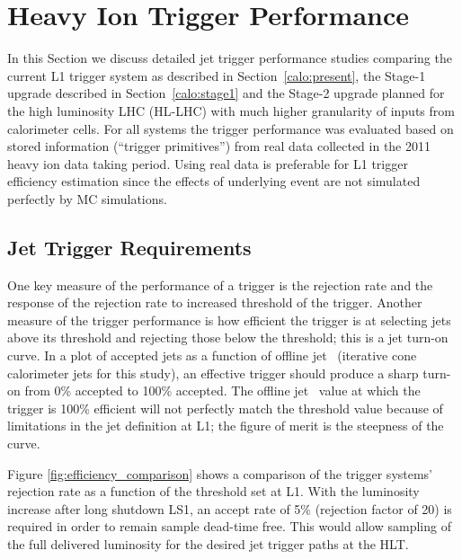 \section{Heavy Ion Trigger Performance} \label{sec:hiTrigPerf}

In this Section we discuss detailed jet trigger performance studies comparing the 
current L1 trigger system as described in Section~\ref{calo:present},
the Stage-1 upgrade described in Section~\ref{calo:stage1} and 
the Stage-2 upgrade  planned for the
high luminosity LHC (HL-LHC) with much higher granularity of inputs from
calorimeter cells. 
For all systems the trigger performance was evaluated based on stored 
information (``trigger primitives'') from real data 
collected in the 2011 heavy ion data taking period.
Using real data is preferable for  L1 trigger efficiency estimation since 
the effects of underlying event are not simulated perfectly by MC
simulations. 

\subsection{Jet Trigger Requirements}
One key measure of the performance of a trigger is the rejection rate and the
response of the rejection rate to increased threshold of the trigger. 
Another measure of the trigger performance  is how efficient the
trigger is at selecting jets above its threshold and rejecting those below
the threshold; this is a jet turn-on curve. In a plot of accepted jets as a
function of offline jet \pt\ (iterative cone calorimeter jets for this
study), an effective trigger should produce a sharp turn-on from 0\% accepted to
100\% accepted. The offline jet \pt\ value at which the trigger is 100\%
efficient will not perfectly match the threshold value because of limitations in the
jet definition at L1; the figure of merit is the steepness of the curve.


Figure \ref{fig:efficiency_comparison} shows a comparison of the trigger
systems' rejection rate as a function of the threshold set at L1. 
With the luminosity increase after long shutdown LS1, an accept rate of 5\% (rejection
factor of 20) is required in order to remain sample dead-time free. This would allow 
sampling of the full delivered luminosity for the desired jet trigger paths 
at the HLT. 


